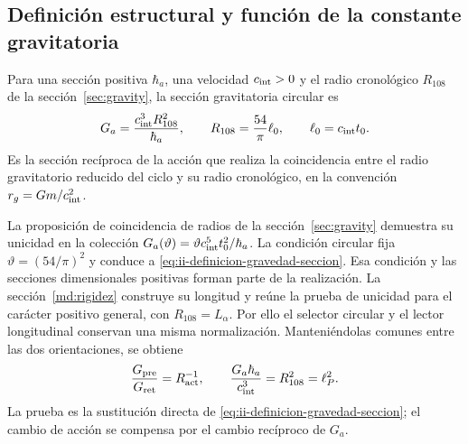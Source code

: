 \subsection{Definición estructural y función de la constante gravitatoria}
\label{sec:ii-definicion-gravedad}

\begin{definition}
Para una sección positiva \(\hbar_a\), una velocidad
\(c_{\rm int}>0\) y el radio cronológico \(R_{108}\) de la
sección~\ref{sec:gravity}, la sección gravitatoria circular es
\begin{equation}
 G_a=\frac{c_{\rm int}^{3}R_{108}^{2}}{\hbar_a},
 \qquad R_{108}=\frac{54}{\pi}\ell_0,
 \qquad \ell_0=c_{\rm int}t_0.
 \label{eq:ii-definicion-gravedad-seccion}
\end{equation}
Es la sección recíproca de la acción que realiza la coincidencia
entre el radio gravitatorio reducido del ciclo y su radio
cronológico, en la convención \(r_g=Gm/c_{\rm int}^2\).
\end{definition}

La proposición de coincidencia de radios de la
sección~\ref{sec:gravity} demuestra su unicidad en la colección
\(G_a(\vartheta)=\vartheta c_{\rm int}^{5}t_0^2/\hbar_a\).
La condición circular fija \(\vartheta=(54/\pi)^2\) y conduce
a \eqref{eq:ii-definicion-gravedad-seccion}. Esa condición y las
secciones dimensionales positivas forman parte de la realización.
La sección~\ref{md:rigidez} construye su longitud y reúne la
prueba de unicidad para el carácter positivo general, con
$R_{108}=L_\alpha$. Por ello el selector circular y el lector
longitudinal conservan una misma normalización.
Manteniéndolas comunes entre las dos orientaciones, se obtiene
\begin{equation}
 \frac{G_{\mathrm{pre}}}{G_{\mathrm{ret}}}
 =R_{\mathrm{act}}^{-1},
 \qquad
 \frac{G_a\hbar_a}{c_{\rm int}^{3}}
 =R_{108}^{2}=\ell_P^2.
 \label{eq:ii-definicion-gravedad-area}
\end{equation}
La prueba es la sustitución directa de
\eqref{eq:ii-definicion-gravedad-seccion}; el cambio de acción
se compensa por el cambio recíproco de \(G_a\).
